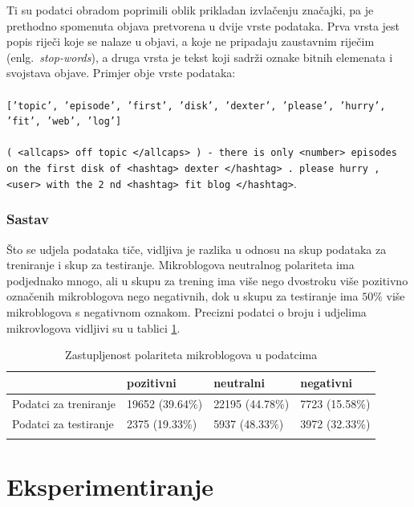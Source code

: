 \documentclass[times, utf8, zavrsni]{fer}
\begin{document}
\noindent Ti su podatci obradom poprimili oblik prikladan izvlačenju značajki, pa je prethodno spomenuta objava pretvorena u dvije vrste podataka. Prva vrsta jest popis riječi koje se nalaze u objavi, a koje ne pripadaju zaustavnim riječim (enlg.~\emph{stop-words}), a druga vrsta je tekst koji sadrži oznake bitnih elemenata i svojstava objave. Primjer obje vrste podataka:\\\\
\texttt{\footnotesize{['topic', 'episode', 'first', 'disk', 'dexter', 'please', 'hurry', \\'fit', 'web', 'log']}}\\\\
\footnotesize{\texttt{( <allcaps> off topic </allcaps> ) - there is only <number> episodes \\on the first disk of <hashtag> dexter </hashtag> . please hurry , \\<user> with the 2 nd <hashtag> fit blog </hashtag>}}.
\normalsize
\subsubsection{Sastav}
Što se udjela podataka tiče, vidljiva je razlika u odnosu na skup podataka za treniranje i skup za testiranje. Mikroblogova neutralnog polariteta ima podjednako mnogo, ali u skupu za trening ima više nego dvostroku više pozitivno označenih mikroblogova nego negativnih, dok u skupu za testiranje ima $50\%$ više mikroblogova s negativnom oznakom. Precizni podatci o broju i udjelima mikrovlogova vidljivi su u tablici \ref{tablbroj}.

\begin{table}[h]
\centering
\begin{tabular}{|l|l|l|l|} 
\hline
                                      &pozitivni               &neutralni               &negativni            \\ 
\hline
Podatci za treniranje & 19652 (39.64\%) & 22195 (44.78\%) & 7723 (15.58\%) \\ 
\hline
Podatci za testiranje  & 2375 (19.33\%)   & 5937 (48.33\%)   & 3972 (32.33\%)  \\ 
\hline
\multicolumn{1}{l}{}  & \multicolumn{1}{l}{} & \multicolumn{1}{l}{} & \multicolumn{1}{l}{} 
\end{tabular}
\caption{Zastupljenost polariteta mikroblogova u podatcima}
\label{tablbroj}
\end{table}

\section{Eksperimentiranje}
\end{document}
